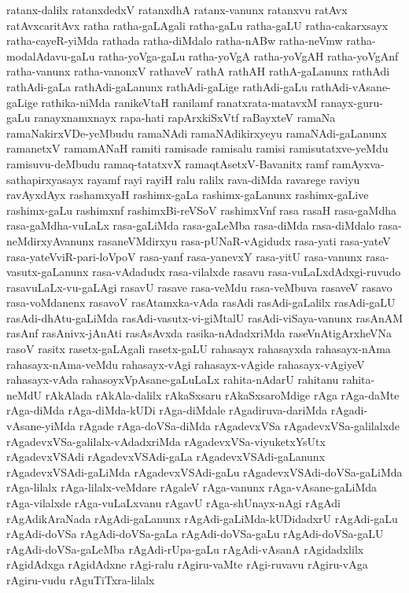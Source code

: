 {ratanx-dalilx
ratanxdedxV
ratanxdhA
ratanx-vanunx
ratanxvu
ratAvx
ratAvxcaritAvx
ratha
ratha-gaLAgali
ratha-gaLu
ratha-gaLU
ratha-cakarxsayx
ratha-cayeR-yiMda
rathada
ratha-diMdalo
ratha-nABw
ratha-neVmw
ratha-modalAdavu-gaLu
ratha-yoVga-gaLu
ratha-yoVgA
ratha-yoVgAH
ratha-yoVgAnf
ratha-vanunx
ratha-vanonxV
rathaveV
rathA
rathAH
rathA-gaLanunx
rathAdi
rathAdi-gaLa
rathAdi-gaLanunx
rathAdi-gaLige
rathAdi-gaLu
rathAdi-vAsane-gaLige
rathika-niMda
ranikeVtaH
ranilamf
ranatxrata-matavxM
ranayx-guru-gaLu
ranayxnamxnayx
rapa-hati
rapArxkiSxVtf
raBayxteV
ramaNa
ramaNakirxVDe-yeMbudu
ramaNAdi
ramaNAdikirxyeyu
ramaNAdi-gaLanunx
ramanetxV
ramamANaH
ramiti
ramisade
ramisalu
ramisi
ramisutatxve-yeMdu
ramisuvu-deMbudu
ramaq-tatatxvX
ramaqtAsetxV-Bavanitx
ramf
ramAyxva-sathapirxyasayx
rayamf
rayi
rayiH
ralu
ralilx
rava-diMda
ravarege
raviyu
ravAyxdAyx
rashamxyaH
rashimx-gaLa
rashimx-gaLanunx
rashimx-gaLive
rashimx-gaLu
rashimxnf
rashimxBi-reVSoV
rashimxVnf
rasa
rasaH
rasa-gaMdha
rasa-gaMdha-vuLaLx
rasa-gaLiMda
rasa-gaLeMba
rasa-diMda
rasa-diMdalo
rasa-neMdirxyAvanunx
rasaneVMdirxyu
rasa-pUNaR-vAgidudx
rasa-yati
rasa-yateV
rasa-yateVviR-pari-loVpoV
rasa-yanf
rasa-yanevxY
rasa-yitU
rasa-vanunx
rasa-vasutx-gaLanunx
rasa-vAdadudx
rasa-vilalxde
rasavu
rasa-vuLaLxdAdxgi-ruvudo
rasavuLaLx-vu-gaLAgi
rasavU
rasave
rasa-veMdu
rasa-veMbuva
rasaveV
rasavo
rasa-voMdanenx
rasavoV
rasAtamxka-vAda
rasAdi
rasAdi-gaLalilx
rasAdi-gaLU
rasAdi-dhAtu-gaLiMda
rasAdi-vasutx-vi-giMtalU
rasAdi-viSaya-vanunx
rasAnAM
rasAnf
rasAnivx-jAnAti
rasAsAvxda
rasika-nAdadxriMda
raseVnAtigArxheVNa
rasoV
rasitx
rasetx-gaLAgali
rasetx-gaLU
rahasayx
rahasayxda
rahasayx-nAma
rahasayx-nAma-veMdu
rahasayx-vAgi
rahasayx-vAgide
rahasayx-vAgiyeV
rahasayx-vAda
rahasoyxVpAsane-gaLuLaLx
rahita-nAdarU
rahitanu
rahita-neMdU
rAkAlada
rAkAla-dalilx
rAkaSxsaru
rAkaSxsaroMdige
rAga
rAga-daMte
rAga-diMda
rAga-diMda-kUDi
rAga-diMdale
rAgadiruva-dariMda
rAgadi-vAsane-yiMda
rAgade
rAga-doVSa-diMda
rAgadevxVSa
rAgadevxVSa-galilalxde
rAgadevxVSa-galilalx-vAdadxriMda
rAgadevxVSa-viyuketxYsUtx
rAgadevxVSAdi
rAgadevxVSAdi-gaLa
rAgadevxVSAdi-gaLanunx
rAgadevxVSAdi-gaLiMda
rAgadevxVSAdi-gaLu
rAgadevxVSAdi-doVSa-gaLiMda
rAga-lilalx
rAga-lilalx-veMdare
rAgaleV
rAga-vanunx
rAga-vAsane-gaLiMda
rAga-vilalxde
rAga-vuLaLxvanu
rAgavU
rAga-shUnayx-nAgi
rAgAdi
rAgAdikAraNada
rAgAdi-gaLanunx
rAgAdi-gaLiMda-kUDidadxrU
rAgAdi-gaLu
rAgAdi-doVSa
rAgAdi-doVSa-gaLa
rAgAdi-doVSa-gaLu
rAgAdi-doVSa-gaLU
rAgAdi-doVSa-gaLeMba
rAgAdi-rUpa-gaLu
rAgAdi-vAsanA
rAgidadxlilx
rAgidAdxga
rAgidAdxne
rAgi-ralu
rAgiru-vaMte
rAgi-ruvavu
rAgiru-vAga
rAgiru-vudu
rAguTiTxra-lilalx
}
